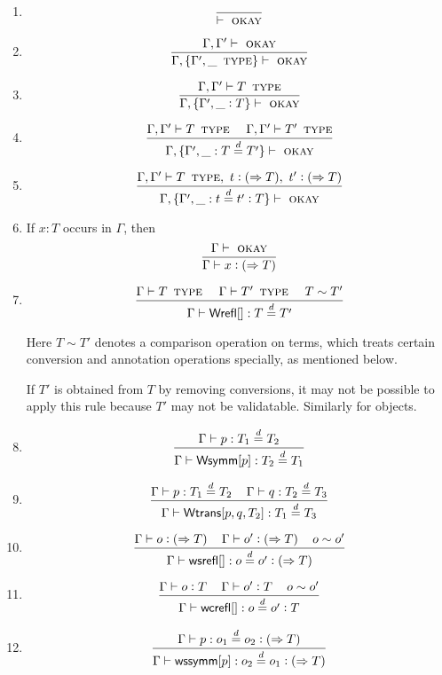 \documentclass[11pt]{article}
\newcommand{\eqd}{\stackrel{d}{=}}
\newcommand{\spc}{{\,\,\,\,\,\,\,}}
\newcommand{\ccolon}[1]{\vcentcolon#1}
\newcommand{\synth}[1]{\vcentcolon(\Rightarrow#1)} %
\newcommand{\ccheck}[1]{\vcentcolon#1}  %
\newcommand{\Type}{\mathop{\text{ \sc type}}}
\newcommand{\Okay}{\mathop{\text{ \sc okay}}}
\newcommand{\ha}[2]{#1[#2]}
\newcommand{\Wrefl}{{\sf Wrefl}}
\newcommand{\Wtrans}{{\sf Wtrans}}
\newcommand{\Wsymm}{{\sf Wsymm}}
\newcommand{\wsrefl}{{\sf wsrefl}}
\newcommand{\wcrefl}{{\sf wcrefl}}
\newcommand{\wssymm}{{\sf wssymm}}
\newcommand{\var}{\char`_}
\begin{document}
\begin{enumerate}

\item
$$\frac{}{\vdash\Okay}$$

\item
$$\frac{\Gamma,\Gamma'\vdash \Okay}{\Gamma,\{\Gamma',\var \Type \} \vdash\Okay}$$

\item
$$\frac{\Gamma,\Gamma'\vdash T \Type}{\Gamma,\{\Gamma',\var \ccolon{T} \} \vdash\Okay}$$

\item
$$\frac{\Gamma,\Gamma'\vdash T \Type \spc \Gamma,\Gamma'\vdash T' \Type}{\Gamma,\{\Gamma',\var : T \eqd T' \} \vdash\Okay}$$

\item
$$\frac{\Gamma,\Gamma'\vdash T \Type,~ t \synth{T},~ t' \synth{T}}{\Gamma,\{\Gamma',\var : t \eqd t' \ccolon{T} \} \vdash\Okay}$$

\item 
If $x:T$ occurs in $\Gamma$, then
$$\frac{\Gamma\vdash\Okay}{\Gamma\vdash x \synth{T}}$$

\item 
$$\frac{\Gamma \vdash T \Type\spc \Gamma \vdash T'\Type \spc T\sim T'}{\Gamma\vdash \ha\Wrefl{}: T\eqd T'}$$

Here $T\sim T'$ denotes a comparison operation on terms, which treats certain
conversion and annotation operations specially, as mentioned below.

If $T'$ is obtained from $T$ by removing conversions, it may not be possible to apply
this rule because $T'$ may not be validatable.  Similarly for objects.

\item 
$$\frac{\Gamma\vdash p:T_1\eqd T_2}{\Gamma\vdash \ha\Wsymm{p}:T_2\eqd T_1}$$

\item 
$$\frac{\Gamma\vdash p:T_1\eqd T_2\spc\Gamma\vdash q:T_2\eqd T_3}{\Gamma\vdash \ha\Wtrans{p,q,T_2}: T_1\eqd T_3}$$

\item 
$$\frac{\Gamma\vdash o \synth{T}\spc\Gamma\vdash o' \synth{T} \spc o \sim o'}{\Gamma\vdash \ha\wsrefl{}:o\eqd o' \synth{T}}$$

\item 
$$\frac{\Gamma\vdash o \ccheck{T}\spc\Gamma\vdash o' \ccheck{T} \spc o \sim o'}{\Gamma\vdash \ha\wcrefl{}:o\eqd o' \ccheck{T}}$$

\item 
$$\frac{\Gamma\vdash p:o_1\eqd o_2 \synth{T}}{\Gamma\vdash \ha\wssymm{p}:o_2\eqd o_1 \synth{T}}$$


\end{enumerate}
\end{document}
